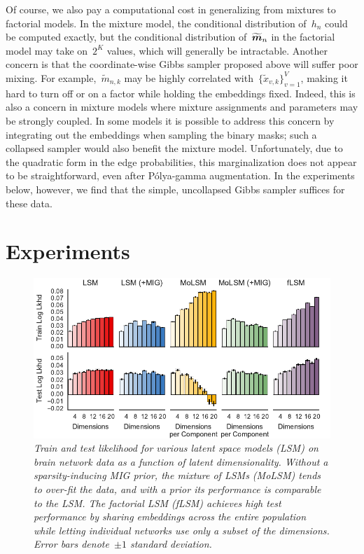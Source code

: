 Of course, we also pay a computational cost in generalizing from
mixtures to factorial models.  In the mixture model, the conditional
distribution of~$h_n$ could be computed exactly, but the conditional
distribution of~$\widetilde{\boldsymbol{m}}_n$ in the factorial model may take
on~$2^K$ values, which will generally be intractable.  Another concern is
that the coordinate-wise Gibbs sampler proposed above will suffer poor
mixing. For example,~$\widetilde{m}_{n,k}$ may be highly correlated
with~$\{\widetilde{x}_{v,k}\}_{v=1}^V$, making it hard to turn off or
on a factor while holding the embeddings fixed. Indeed, this is also a
concern in mixture models where mixture assignments and parameters may
be strongly coupled. In some models it is possible to address this
concern by integrating out the embeddings when sampling the binary
masks; such a collapsed sampler would also benefit the mixture model.
Unfortunately, due to the quadratic form in the edge probabilities,
this marginalization does not appear to be straightforward, even after
P\'{o}lya-gamma augmentation.  In the experiments below, however, we find that
the simple, uncollapsed Gibbs sampler suffices for these data. 

\section{Experiments}



\begin{figure}[t]
\includegraphics[width=\linewidth]{figures/lls.pdf}
\caption{\textit{Train and test likelihood for various
    latent space models (LSM) on brain network data as a function of
    latent dimensionality. Without a sparsity-inducing MIG prior,
    the mixture of LSMs (MoLSM) tends to over-fit the data, and with a prior its
    performance is comparable to the LSM.  The factorial LSM (fLSM)
    achieves high test performance by sharing embeddings across the
    entire population while letting individual networks use only a subset
    of the dimensions. Error bars denote~$\pm 1$ standard deviation.}}
\label{fig:lls}
\end{figure}


